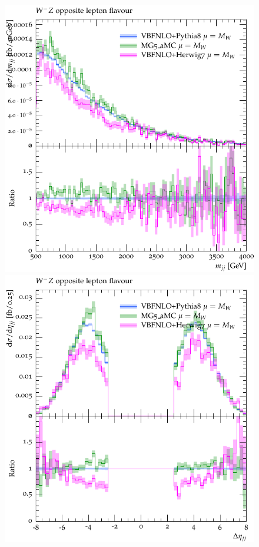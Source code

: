 \documentclass[11pt]{cernrep}
\begin{document}
\begin{figure}[htbp]
\begin{center}
   \includegraphics[scale=0.5]{figs/VBFNLO_WmZ_OF_mjj}
   \includegraphics[scale=0.5]{figs/VBFNLO_WmZ_OF_dEtajj}

\end{center}
\end{figure}
\end{document}
